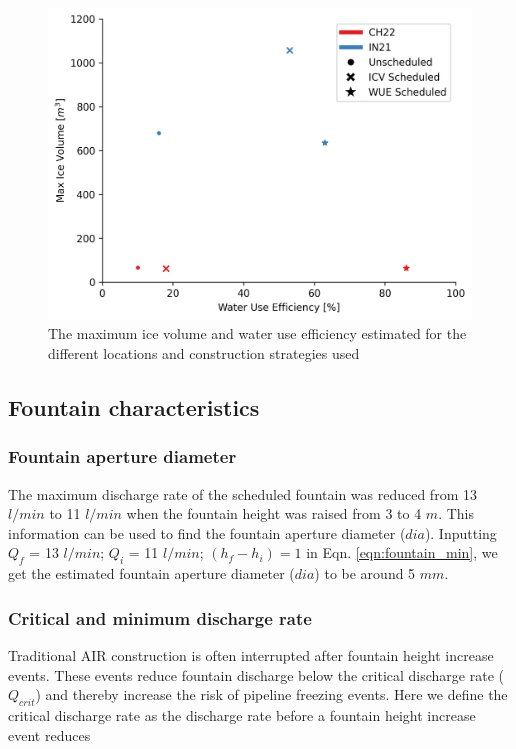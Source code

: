 \documentclass[tc, manuscript]{copernicus}
\begin{document}
\begin{figure}[t]
\includegraphics[width=12cm]{Figures/wue.png}
\caption{The maximum ice volume and water use efficiency estimated for the different locations and construction
strategies used}
\label{fig:wue}
\end{figure}

\subsection{Fountain characteristics}

\subsubsection{Fountain aperture diameter}

The maximum discharge rate of the scheduled fountain was reduced from 13 $l/min$ to 11 $l/min$ when the fountain
height was raised from 3 to 4 $m$. This information can be used to find the fountain aperture diameter ($dia$).
Inputting $Q_f$ = 13 $l/min$; $Q_i$ = 11 $l/min$; $(h_f-h_i) = 1$ in Eqn. \ref{eqn:fountain_min}, we get the estimated
fountain aperture diameter ($dia$) to be around 5 $mm$. 

\subsubsection{Critical and minimum discharge rate}

Traditional AIR construction is often interrupted after fountain height increase events. These events reduce
fountain discharge below the critical discharge rate ($Q_{crit}$) and thereby increase the risk of pipeline
freezing events. Here we define the critical discharge rate as the discharge rate before a fountain height
increase event reduces  
\end{document}
